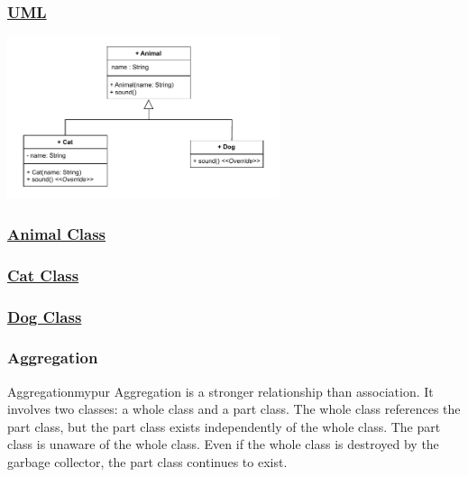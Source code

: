 \subsubsection*{\underline{UML}}

\begin{center}
\includegraphics[width=0.6\textwidth]{Chapters/Diagram/OOP/EX4/ex4.drawio.pdf}
\end{center}


\subsubsection*{\underline{Animal Class}}


\subsubsection*{\underline{Cat Class}}


\subsubsection*{\underline{Dog Class}}


\subsubsection*{Aggregation}

\begin{prettyBox}{Aggregation}{mypur}
Aggregation is a stronger relationship than association. It involves two classes: a whole class and a part class. The whole class references the part class, but the part class exists independently of the whole class. The part class is unaware of the whole class. Even if the whole class is destroyed by the garbage collector, the part class continues to exist.
\end{prettyBox}

